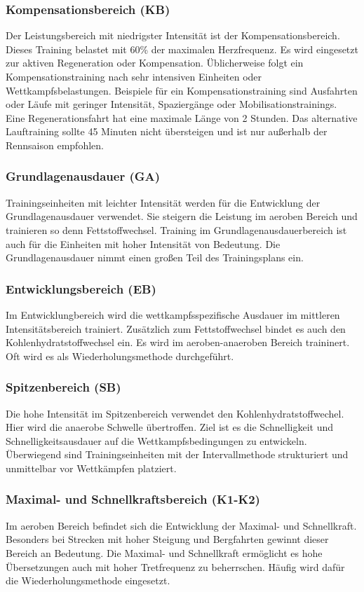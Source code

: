 \subsubsection{Kompensationsbereich (KB)}
Der Leistungsbereich mit niedrigster Intensität ist der Kompensationsbereich. Dieses Training belastet mit 60\% der maximalen Herzfrequenz. Es wird eingesetzt zur aktiven Regeneration oder Kompensation. Üblicherweise folgt ein Kompensationstraining nach sehr intensiven Einheiten oder Wettkampfsbelastungen. Beispiele für ein Kompensationstraining sind Ausfahrten oder Läufe mit geringer Intensität, Spaziergänge oder Mobilisationstrainings. \cite[31-32]{Radsporttraining}
Eine Regenerationsfahrt hat eine maximale Länge von 2 Stunden. Das alternative Lauftraining sollte 45 Minuten nicht übersteigen und ist nur außerhalb der Rennsaison empfohlen.
\subsubsection{Grundlagenausdauer (GA)}
Trainingseinheiten mit leichter Intensität werden für die Entwicklung der Grundlagenausdauer verwendet. Sie steigern die Leistung im aeroben Bereich  und trainieren so denn Fettstoffwechsel.
Training im Grundlagenausdauerbereich ist auch für die Einheiten mit hoher Intensität von Bedeutung. Die Grundlagenausdauer nimmt einen großen Teil des Trainingsplans ein.
\subsubsection{Entwicklungsbereich (EB)}
Im Entwicklungbereich wird die wettkampfsspezifische Ausdauer im mittleren Intensitätsbereich trainiert. Zusätzlich zum Fettstoffwechsel bindet es auch den Kohlenhydratstoffwechsel ein. Es wird im aeroben-anaeroben Bereich traininert. Oft wird es als Wiederholungsmethode durchgeführt.
\subsubsection{Spitzenbereich (SB)}
Die hohe Intensität im Spitzenbereich verwendet den Kohlenhydratstoffwechel. Hier wird die anaerobe Schwelle übertroffen. Ziel ist es die Schnelligkeit und Schnelligkeitsausdauer auf die Wettkampfsbedingungen zu entwickeln. Überwiegend sind Trainingseinheiten mit der Intervallmethode strukturiert und unmittelbar vor Wettkämpfen platziert.
\subsubsection{Maximal- und Schnellkraftsbereich (K1-K2)}
Im aeroben Bereich befindet sich die Entwicklung der Maximal- und Schnellkraft. Besonders bei Strecken mit hoher Steigung und Bergfahrten gewinnt dieser Bereich an Bedeutung. Die Maximal- und Schnellkraft ermöglicht es hohe Übersetzungen auch mit hoher Tretfrequenz zu beherrschen. Häufig wird dafür die Wiederholungsmethode eingesetzt.
